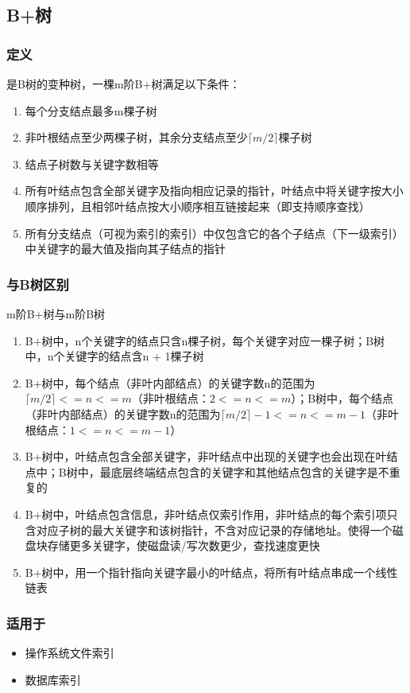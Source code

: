 \subsection{B+树}\label{B+树}

\subsubsection{定义}
是B树的变种树，一棵m阶B+树满足以下条件：
\begin{enumerate}
    \item 每个分支结点最多m棵子树
    \item 非叶根结点至少两棵子树，其余分支结点至少\(\lceil m / 2\rceil\)棵子树
    \item 结点子树数与关键字数相等
    \item 所有叶结点包含全部关键字及指向相应记录的指针，叶结点中将关键字按大小顺序排列，且相邻叶结点按大小顺序相互链接起来（即支持顺序查找）
    \item 所有分支结点（可视为索引的索引）中仅包含它的各个子结点（下一级索引）中关键字的最大值及指向其子结点的指针
\end{enumerate}


\subsubsection{与B树区别}
m阶B+树与m阶B树
\begin{enumerate}
    \item B+树中，n个关键字的结点只含n棵子树，每个关键字对应一棵子树；B树中，n个关键字的结点含n + 1棵子树
    \item B+树中，每个结点（非叶内部结点）的关键字数n的范围为\(\lceil m / 2\rceil <= n <= m\)（非叶根结点：\(2 <= n <= m\)）；B树中，每个结点（非叶内部结点）的关键字数n的范围为\(\lceil m / 2\rceil - 1 <= n <= m - 1\)（非叶根结点：\(1 <= n <= m - 1\)）
    \item B+树中，叶结点包含全部关键字，非叶结点中出现的关键字也会出现在叶结点中；B树中，最底层终端结点包含的关键字和其他结点包含的关键字是不重复的
    \item B+树中，叶结点包含信息，非叶结点仅索引作用，非叶结点的每个索引项只含对应子树的最大关键字和该树指针，不含对应记录的存储地址。使得一个磁盘块存储更多关键字，使磁盘读/写次数更少，查找速度更快
    \item B+树中，用一个指针指向关键字最小的叶结点，将所有叶结点串成一个线性链表
\end{enumerate}


\subsubsection{适用于}
\begin{itemize}
    \item 操作系统文件索引
    \item 数据库索引
\end{itemize}


